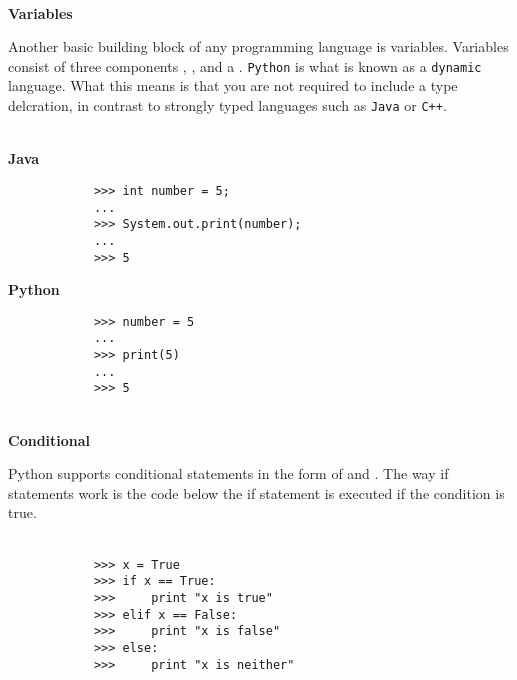 \documentclass[letterpaper,11pt]{article}
\begin{document}
\\
\textbf{Variables}
\par{Another basic building block of any programming language is variables.
Variables consist of three components , , and
a . \texttt{Python} is what is known as a \texttt{dynamic}
language. What this means is that you are not required to include a type
delcration, in contrast to strongly typed languages such as \texttt{Java} or
\texttt{C++}.}
\\ \\
%
\begin{minipage}{.5\textwidth}
    \small \textbf{Java}
    \begin{tcolorbox}
        \begin{footnotesize}
            \begin{verbatim}
            >>> int number = 5;
            ...
            >>> System.out.print(number);
            ...
            >>> 5
            \end{verbatim}
        \end{footnotesize}
    \end{tcolorbox}
\end{minipage}
%
\begin{minipage}{.5\textwidth}
    \small \textbf{Python}
    \begin{tcolorbox}
        \begin{footnotesize}
            \begin{verbatim}
            >>> number = 5
            ...
            >>> print(5)
            ...
            >>> 5
            \end{verbatim}
        \end{footnotesize}
    \end{tcolorbox}
\end{minipage}
\\
\textbf{Conditional}
\par{Python supports conditional statements in the form of 
and . The way if statements work is the code below the if statement
is executed if the condition is true.} \\ \\
\begin{minipage}{.5\textwidth}
    \begin{tcolorbox}
        \begin{footnotesize}
            \begin{verbatim}
            >>> x = True
            >>> if x == True:
            >>>     print "x is true"
            >>> elif x == False:
            >>>     print "x is false"
            >>> else:
            >>>     print "x is neither"
            \end{verbatim}
        \end{footnotesize}
    \end{tcolorbox}
\end{minipage}
\end{document}
